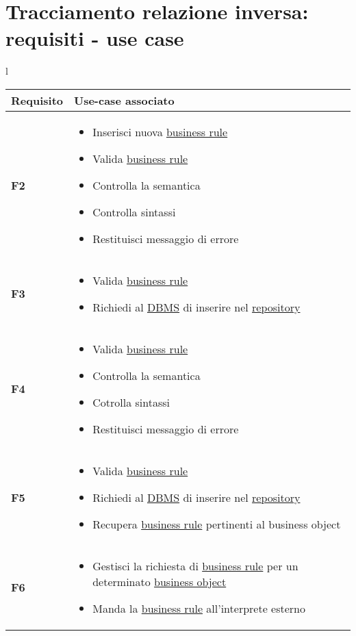 \section{Tracciamento relazione inversa: requisiti - use case}
\large{
\begin{tabular}{l}
\begin{tabular}{||p{2cm}||p{10cm}||} \hline
\textbf{Requisito} & \textbf{Use-case associato} \\ \hline
\textbf {F2} & \begin{itemize}
\item Inserisci nuova \underline{business rule}
\item Valida \underline{business rule}
\item Controlla la semantica
\item Controlla sintassi
\item Restituisci messaggio di errore
\end{itemize} \\ \hline
\textbf{F3} & \begin{itemize}
\item Valida \underline{business rule}
\item Richiedi al \underline{DBMS} di inserire nel \underline{repository}
\end{itemize} \\ \hline
\textbf{F4} & \begin{itemize}
\item Valida \underline{business rule}
\item Controlla la semantica
\item Cotrolla sintassi
\item Restituisci messaggio di errore
\end{itemize} \\ \hline
\textbf{F5} & \begin{itemize}
\item Valida \underline{business rule}
\item Richiedi al \underline{DBMS} di inserire nel \underline{repository}
\item Recupera \underline{business rule} pertinenti al business object
\end{itemize} \\ \hline
\textbf{F6} & \begin{itemize}
\item Gestisci la richiesta di \underline{business rule} per un determinato \underline{business object}
\item Manda la \underline{business rule} all'interprete esterno
\end{itemize} \\ \hline
\end{tabular}
\end{tabular}

}
